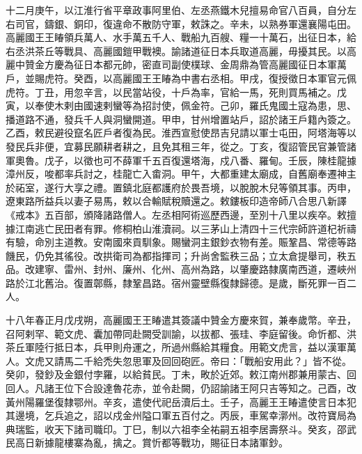 \begin{pinyinscope}
 十二月庚午，以江淮行省平章政事阿里伯、左丞燕鐵木兒擅易命官八百員，自分左右司官，鑄銀、銅印，復違命不散防守軍，敕誅之。辛未，以熟券軍還襄陽屯田。高麗國王王睶領兵萬人、水手萬五千人、戰船九百艘、糧一十萬石，出征日本，給右丞洪茶丘等戰具、高麗國鎧甲戰襖。諭諸道征日本兵取道高麗，毋擾其民。以高麗中贊金方慶為征日本都元帥，密直司副使樸球、金周鼎為管高麗國征日本軍萬戶，並賜虎符。癸酉，以高麗國王王睶為中書右丞相。甲戌，復授徵日本軍官元佩虎符。丁丑，用忽辛言，以民當站役，十戶為率，官給一馬，死則買馬補之。戊寅，以奉使木剌由國速剌蠻等為招討使，佩金符。己卯，羅氏鬼國土寇為患，思、播道路不通，發兵千人與洞蠻開道。甲申，甘州增置站戶，詔於諸王戶籍內簽之。乙酉，敕民避役竄名匠戶者復為民。淮西宣慰使昂吉兒請以軍士屯田，阿塔海等以發民兵非便，宜募民願耕者耕之，且免其租三年，從之。丁亥，復詔管民官兼管諸軍奧魯。戊子，以徵也可不薛軍千五百復還塔海，戍八番、羅甸。壬辰，陳桂龍據漳州反，唆都率兵討之，桂龍亡入畬洞。甲午，大都重建太廟成，自舊廟奉遷神主於祏室，遂行大享之禮。置鎮北庭都護府於畏吾境，以脫脫木兒等領其事。丙申，遼東路所益兵以妻子易馬，敕以合輸賦稅贖還之。敕鏤板印造帝師八合思八新譯《戒本》五百部，頒降諸路僧人。左丞相阿術巡歷西邊，至別十八里以疾卒。敕擅據江南逃亡民田者有罪。修桐柏山淮瀆祠。以三茅山上清四十三代宗師許道杞祈禱有驗，命別主道教。安南國來貢馴象。賜蠻洞主銀鈔衣物有差。賑鞏昌、常德等路饑民，仍免其徭役。改拱衛司為都指揮司；升尚舍監秩三品；立太倉提舉司，秩五品。改建寧、雷州、封州、廉州、化州、高州為路，以肇慶路隸廣南西道，遷峽州路於江北舊治。復置鄣縣，隸鞏昌路。宿州靈壁縣復隸歸德。是歲，斷死罪一百二人。



 十八年春正月戊戌朔，高麗國王王睶遣其簽議中贊金方慶來賀，兼奉歲幣。辛丑，召阿剌罕、範文虎、囊加帶同赴闕受訓諭，以拔都、張珪、李庭留後。命忻都、洪茶丘軍陸行抵日本，兵甲則舟運之，所過州縣給其糧食。用範文虎言，益以漢軍萬人。文虎又請馬二千給禿失忽思軍及回回砲匠。帝曰：「戰船安用此？」皆不從。癸卯，發鈔及金銀付孛羅，以給貧民。丁未，畋於近郊。敕江南州郡兼用蒙古、回回人。凡諸王位下合設達魯花赤，並令赴闕，仍詔諭諸王阿只吉等知之。己酉，改黃州陽羅堡復隸鄂州。辛亥，遣使代祀岳瀆后土。壬子，高麗王王睶遣使言日本犯其邊境，乞兵追之，詔以戍金州隘口軍五百付之。丙辰，車駕幸漷州。改符寶局為典瑞監，收天下諸司職印。丁巳，制以六祖李全祐嗣五祖李居壽祭斗。癸亥，邵武民高日新據龍樓寨為亂，擒之。賞忻都等戰功，賜征日本諸軍鈔。




\end{pinyinscope}
